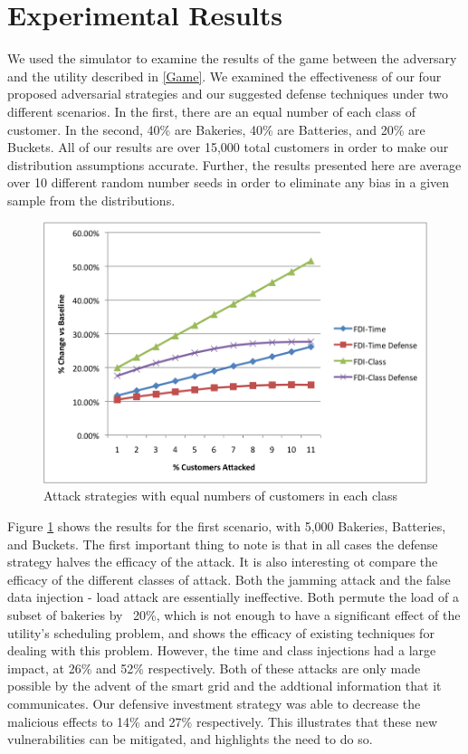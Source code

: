 \section{Experimental Results}
\label{Experimental Results}

We used the simulator to examine the results of the game between the adversary and the utility described in \ref{Game}.  We examined the effectiveness of our four proposed adversarial strategies and our suggested defense techniques under two different scenarios.  In the first, there are an equal number of each class of customer.  In the second, 40\% are Bakeries, 40\% are Batteries, and 20\% are Buckets.  All of our results are over 15,000 total customers in order to make our distribution assumptions accurate.  Further, the results presented here are average over 10 different random number seeds in order to eliminate any bias in a given sample from the distributions.

\begin{figure}[!htbp]
\centering
\includegraphics[width=.5\textwidth]{equal-attacks.png}
\caption{Attack strategies with equal numbers of customers in each class}
\label{equal-attack}
\end{figure}

Figure \ref{equal-attack} shows the results for the first scenario, with 5,000 Bakeries, Batteries, and Buckets.  The first important thing to note is that in all cases the defense strategy halves the efficacy of the attack.  It is also interesting ot compare the efficacy of the different classes of attack.  Both the jamming attack and the false data injection - load attack are essentially ineffective.  Both permute the load of a subset of bakeries by ~20\%, which is not enough to have a significant effect of the utility's scheduling problem, and shows the efficacy of existing techniques for dealing with this problem.  However, the time and class injections had a large impact, at 26\% and 52\% respectively.  Both of these attacks are only made possible by the advent of the smart grid and the addtional information that it communicates.  Our defensive investment strategy was able to decrease the malicious effects to 14\% and 27\% respectively.  This illustrates that these new vulnerabilities can be mitigated, and highlights the need to do so.


